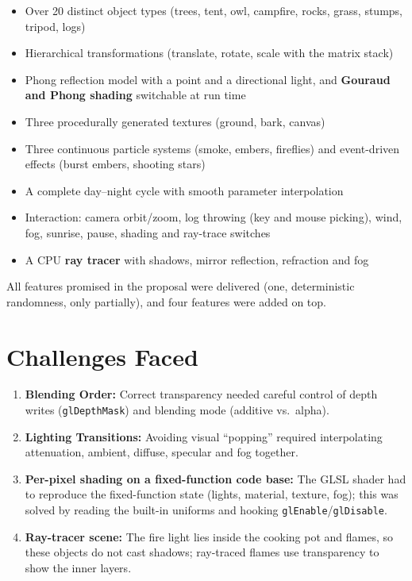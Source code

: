 \documentclass[12pt,a4paper]{report}
\begin{document}
\begin{itemize}[leftmargin=0.45in]
  \item Over 20 distinct object types (trees, tent, owl, campfire, rocks, grass, stumps, tripod, logs)
  \item Hierarchical transformations (translate, rotate, scale with the matrix stack)
  \item Phong reflection model with a point and a directional light, and \textbf{Gouraud and Phong shading} switchable at run time
  \item Three procedurally generated textures (ground, bark, canvas)
  \item Three continuous particle systems (smoke, embers, fireflies) and event-driven effects (burst embers, shooting stars)
  \item A complete day--night cycle with smooth parameter interpolation
  \item Interaction: camera orbit/zoom, log throwing (key and mouse picking), wind, fog, sunrise, pause, shading and ray-trace switches
  \item A CPU \textbf{ray tracer} with shadows, mirror reflection, refraction and fog
\end{itemize}

All features promised in the proposal were delivered (one, deterministic randomness, only partially), and four features were added on top.

\section{Challenges Faced}

\begin{enumerate}[leftmargin=0.45in]
  \item \textbf{Blending Order:} Correct transparency needed careful control of depth writes (\texttt{glDepthMask}) and blending mode (additive vs.\ alpha).
  \item \textbf{Lighting Transitions:} Avoiding visual ``popping'' required interpolating attenuation, ambient, diffuse, specular and fog together.
  \item \textbf{Per-pixel shading on a fixed-function code base:} The GLSL shader had to reproduce the fixed-function state (lights, material, texture, fog); this was solved by reading the built-in uniforms and hooking \texttt{glEnable}/\texttt{glDisable}.
  \item \textbf{Ray-tracer scene:} The fire light lies inside the cooking pot and flames, so these objects do not cast shadows; ray-traced flames use transparency to show the inner layers.
\end{enumerate}
\end{document}
